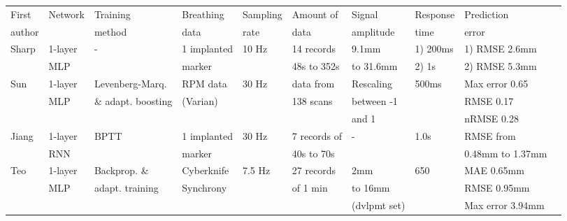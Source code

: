 \documentclass[twocolumn,a4paper]{svjour3} \sloppy          \smartqed
\begin{document}
\begin{table*}[htb]
\setlength{\tabcolsep}{1.5pt}
\begin{center}
\begin{tabular}{llllllllll}
\hline
First                          & Network & Training          & Breathing      & Sampling & Amount of       & Signal      & Response & Prediction       \\
author                         &         & method            & data           & rate     & data            & amplitude   & time     & error            \\
\hline
\hline
Sharp \cite{sharp2004prediction}& 1-layer & -                 & 1 implanted    & 10 Hz    & 14 records      & 9.1mm       & 1) 200ms & 1) RMSE 2.6mm   \\
                                & MLP     &                   & marker         &          & 48s to 352s     & to 31.6mm   & 2) 1s    & 2) RMSE 5.3mm  \\
Sun \cite{sun2017respiratory}  & 1-layer & Levenberg-Marq.   & RPM data       & 30 Hz    & data from       & Rescaling   & 500ms    & Max error 0.65   \\
                               & MLP     & \& adapt. boosting& (Varian)       &          & 138 scans       & between -1  &          & RMSE 0.17        \\
                               &         &                   &                &          &                 & and 1       &          & nRMSE 0.28       \\                                                              
Jiang \cite{kai2018prediction}   & 1-layer & BPTT              & 1 implanted    & 30 Hz    & 7 records of    & -           & 1.0s     & RMSE from        \\
                               & RNN     &                   & marker         &          & 40s to 70s      &             &          & 0.48mm to 1.37mm \\
Teo \cite{teo2018feasibility}  & 1-layer & Backprop. \&      & Cyberknife     & 7.5 Hz   & 27 records      & 2mm         & 650      & MAE 0.65mm       \\                               
                               & MLP     & adapt. training  & Synchrony      &          & of 1 min        & to 16mm     &          & RMSE 0.95mm      \\
                               &         &                   &                &          &                 & (dvlpmt set)&          & Max error 3.94mm \\                                                              

\end{tabular}
\end{center}
\end{table*}
\end{document}
